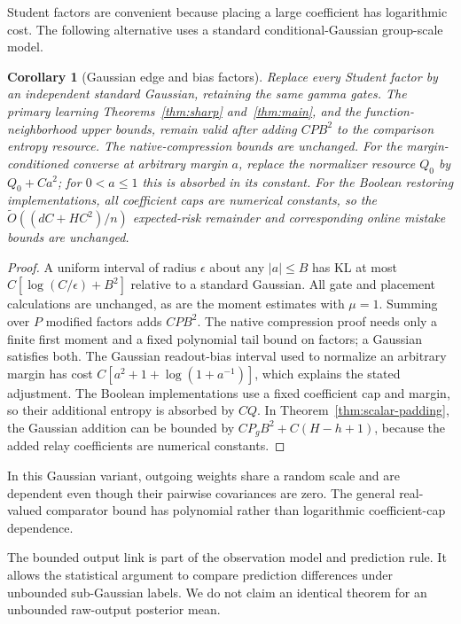 \documentclass[11pt]{article}
\newtheorem{corollary}[theorem]{Corollary}\newtheorem{proposition}[theorem]{Proposition}
\theoremstyle{remark}\newtheorem{remark}[theorem]{Remark}
\begin{document}
Student factors are convenient because placing a large coefficient has logarithmic cost. The following alternative uses a standard conditional-Gaussian group-scale model.

\begin{corollary}[Gaussian edge and bias factors]\label{cor:Gaussian-factors}
Replace every Student factor by an independent standard Gaussian, retaining the same gamma gates. The primary learning Theorems~\ref{thm:sharp} and~\ref{thm:main}, and the function-neighborhood upper bounds, remain valid after adding $CPB^2$ to the comparison entropy resource. The native-compression bounds are unchanged. For the margin-conditioned converse at arbitrary margin $a$, replace the normalizer resource $Q_0$ by $Q_0+Ca^2$; for $0<a\le1$ this is absorbed in its constant. For the Boolean restoring implementations, all coefficient caps are numerical constants, so the $\widetilde O((dC+HC^2)/n)$ expected-risk remainder and corresponding online mistake bounds are unchanged.
\end{corollary}
\begin{proof}
A uniform interval of radius $\epsilon$ about any $|a|\le B$ has KL at most $C[\log(C/\epsilon)+B^2]$ relative to a standard Gaussian. All gate and placement calculations are unchanged, as are the moment estimates with $\mu=1$. Summing over $P$ modified factors adds $CPB^2$. The native compression proof needs only a finite first moment and a fixed polynomial tail bound on factors; a Gaussian satisfies both. The Gaussian readout-bias interval used to normalize an arbitrary margin has cost $C[a^2+1+\log(1+a^{-1})]$, which explains the stated adjustment. The Boolean implementations use a fixed coefficient cap and margin, so their additional entropy is absorbed by $CQ$. In Theorem~\ref{thm:scalar-padding}, the Gaussian addition can be bounded by $CP_gB^2+C(H-h+1)$, because the added relay coefficients are numerical constants.
\end{proof}

In this Gaussian variant, outgoing weights share a random scale and are dependent even though their pairwise covariances are zero. The general real-valued comparator bound has polynomial rather than logarithmic coefficient-cap dependence.

The bounded output link is part of the observation model and prediction rule. It allows the statistical argument to compare prediction differences under unbounded sub-Gaussian labels. We do not claim an identical theorem for an unbounded raw-output posterior mean.
\end{document}
